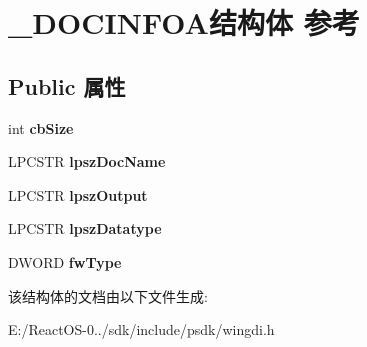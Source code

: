 \hypertarget{struct___d_o_c_i_n_f_o_a}{}\section{\+\_\+\+D\+O\+C\+I\+N\+F\+O\+A结构体 参考}
\label{struct___d_o_c_i_n_f_o_a}
\subsection*{Public 属性}
\begin{DoxyCompactItemize}
\item 
\mbox{\label{struct___d_o_c_i_n_f_o_a_a192773fde6b12fb79f9d53905bf0fda9}} 
int {\bfseries cb\+Size}
\item 
\mbox{\label{struct___d_o_c_i_n_f_o_a_add80e978aad1c2a0e1321146da989870}} 
L\+P\+C\+S\+TR {\bfseries lpsz\+Doc\+Name}
\item 
\mbox{\label{struct___d_o_c_i_n_f_o_a_a3a6d48b615322c09396dc50d322db8ea}} 
L\+P\+C\+S\+TR {\bfseries lpsz\+Output}
\item 
\mbox{\label{struct___d_o_c_i_n_f_o_a_aac5802ce283380c82d9b071fe5162f7d}} 
L\+P\+C\+S\+TR {\bfseries lpsz\+Datatype}
\item 
\mbox{\label{struct___d_o_c_i_n_f_o_a_ae6641115d64c1f27705849eb4758cb08}} 
D\+W\+O\+RD {\bfseries fw\+Type}
\end{DoxyCompactItemize}


该结构体的文档由以下文件生成\+:\begin{DoxyCompactItemize}
\item 
E\+:/\+React\+O\+S-\/0../sdk/include/psdk/wingdi.\+h\end{DoxyCompactItemize}
